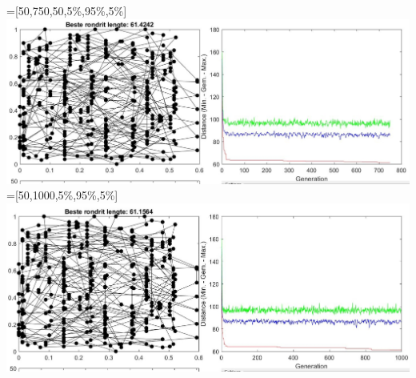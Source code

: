  =[50,750,50,5\%,95\%,5\%] \\
\includegraphics[width=\textwidth]{img/specific/xalt_edges/general_4.jpg}\\
 =[50,1000,5\%,95\%,5\%]\\
\includegraphics[width=\textwidth]{img/specific/xalt_edges/general_5.jpg}\\
\\


